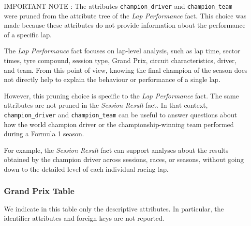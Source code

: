 \documentclass[a4paper,11pt]{article}
\begin{document}
	IMPORTANT NOTE : 
	The attributes \texttt{champion\_driver} and \texttt{champion\_team} were pruned from
	the attribute tree of the \textit{Lap Performance} fact. This choice was made because
	these attributes do not provide information about the performance of a specific lap.
	
	The \textit{Lap Performance} fact focuses on lap-level analysis, such as lap time, sector
	times, tyre compound, session type, Grand Prix, circuit characteristics, driver, and team.
	From this point of view, knowing the final champion of the season does not directly help
	to explain the behaviour or performance of a single lap.
	
	However, this pruning choice is specific to the \textit{Lap Performance} fact. The same
	attributes are not pruned in the \textit{Session Result} fact. In that context,
	\texttt{champion\_driver} and \texttt{champion\_team} can be useful to answer questions
	about how the world champion driver or the championship-winning team performed during
	a Formula 1 season.
	
	For example, the \textit{Session Result} fact can support analyses about the results
	obtained by the champion driver across sessions, races, or seasons, without going down
	to the detailed level of each individual racing lap.

	
	
	\subsubsection{Grand Prix Table}
	
	We indicate in this table only the descriptive attributes. In particular, the identifier attributes and foreign keys are not reported.
	
\end{document}
